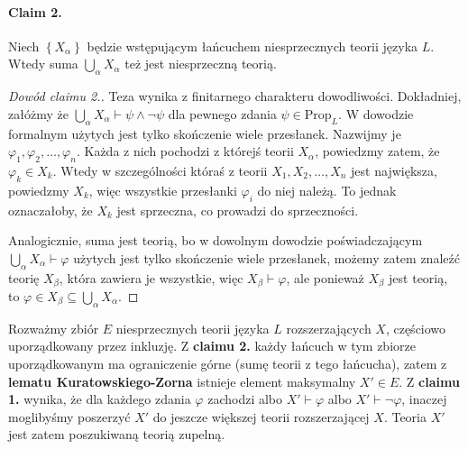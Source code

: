 \paragraph{Claim 2.} Niech \( \left\{ X_\alpha \right\} \) będzie wstępującym łańcuchem niesprzecznych teorii języka \( L \). Wtedy suma \( \bigcup_\alpha X_\alpha \) też jest niesprzeczną teorią.

\begin{proof}[Dowód claimu 2.]
    Teza wynika z finitarnego charakteru dowodliwości. Dokładniej, załóżmy że \( \bigcup_\alpha X_\alpha \vdash \psi \wedge \neg \psi \) dla pewnego zdania \( \psi \in \mathrm{Prop}_L \). W dowodzie formalnym użytych jest tylko skończenie wiele przesłanek. Nazwijmy je \( \varphi_1, \varphi_2, \ldots, \varphi_n \). Każda z nich pochodzi z którejś teorii \( X_\alpha \), powiedzmy zatem, że \( \varphi_k \in X_k \). Wtedy w szczególności któraś z teorii \( X_1, X_2, \ldots, X_n \) jest największa, powiedzmy \( X_k \), więc wszystkie przesłanki \( \varphi_i \) do niej należą. To jednak oznaczałoby, że \( X_k \) jest sprzeczna, co prowadzi do sprzeczności.

    Analogicznie, suma jest teorią, bo w dowolnym dowodzie poświadczającym \( \bigcup_\alpha X_\alpha \vdash \varphi \) użytych jest tylko skończenie wiele przesłanek, możemy zatem znaleźć teorię \( X_\beta \), która zawiera je wszystkie, więc \( X_\beta \vdash \varphi \), ale ponieważ \( X_\beta \) jest teorią, to \( \varphi \in X_\beta \subseteq \bigcup_\alpha X_\alpha \).
\end{proof}

Rozważmy zbiór \( E \) niesprzecznych teorii języka \( L \) rozszerzających \( X \), częściowo uporządkowany przez inkluzję. Z \textbf{claimu 2.} każdy łańcuch w tym zbiorze uporządkowanym ma ograniczenie górne (sumę teorii z tego łańcucha), zatem z \textbf{lematu Kuratowskiego-Zorna} istnieje element maksymalny \( X' \in E \). Z \textbf{claimu 1.} wynika, że dla każdego zdania \( \varphi \) zachodzi albo \( X' \vdash \varphi \) albo \( X' \vdash \neg\varphi \), inaczej moglibyśmy poszerzyć \( X' \) do jeszcze większej teorii rozszerzającej \( X \). Teoria \( X' \) jest zatem poszukiwaną teorią zupelną.
